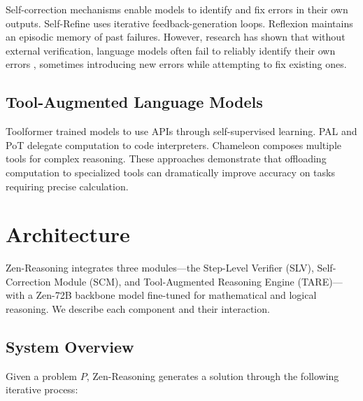\documentclass[11pt,a4paper]{article}
\begin{document}
Self-correction mechanisms enable models to identify and fix errors in their own outputs. Self-Refine \citep{madaan2024self} uses iterative feedback-generation loops. Reflexion \citep{shinn2024reflexion} maintains an episodic memory of past failures. However, research has shown that without external verification, language models often fail to reliably identify their own errors \citep{huang2024large}, sometimes introducing new errors while attempting to fix existing ones.

\subsection{Tool-Augmented Language Models}

Toolformer \citep{schick2024toolformer} trained models to use APIs through self-supervised learning. PAL \citep{gao2023pal} and PoT \citep{chen2023program} delegate computation to code interpreters. Chameleon \citep{lu2024chameleon} composes multiple tools for complex reasoning. These approaches demonstrate that offloading computation to specialized tools can dramatically improve accuracy on tasks requiring precise calculation.

\section{Architecture}
\label{sec:architecture}

Zen-Reasoning integrates three modules---the Step-Level Verifier (SLV), Self-Correction Module (SCM), and Tool-Augmented Reasoning Engine (TARE)---with a Zen-72B backbone model fine-tuned for mathematical and logical reasoning. We describe each component and their interaction.

\subsection{System Overview}

Given a problem $P$, Zen-Reasoning generates a solution through the following iterative process:
\end{document}
